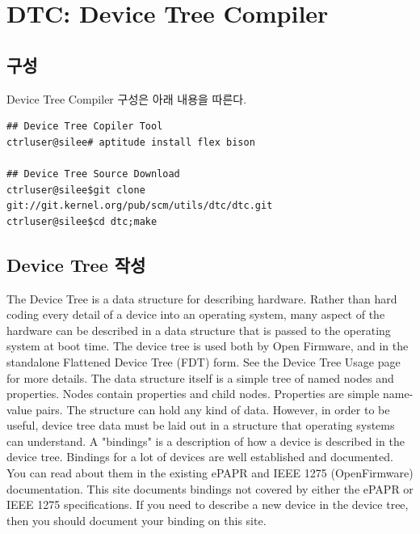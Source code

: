 \documentclass[11pt
  , a4paper
  , article
  , oneside
]{memoir}
\begin{document}
\hfil\break

\chapter{DTC: Device Tree Compiler}


\section{구성}
Device Tree Compiler 구성은 아래 내용을 따른다.
\begin{lstlisting}[style=termstyle]
## Device Tree Copiler Tool
ctrluser@silee# aptitude install flex bison

## Device Tree Source Download
ctrluser@silee$git clone git://git.kernel.org/pub/scm/utils/dtc/dtc.git
ctrluser@silee$cd dtc;make
\end{lstlisting}
\section{Device Tree 작성}
The Device Tree is a data structure for describing hardware. Rather than hard coding every detail of a device into an operating system, many aspect of the hardware can be described in a data structure that is passed to the operating system at boot time. The device tree is used both by Open Firmware, and in the standalone Flattened Device Tree (FDT) form.
See the Device Tree Usage page for more details.
The data structure itself is a simple tree of named nodes and properties. Nodes contain properties and child nodes. Properties are simple name-value pairs. The structure can hold any kind of data.
However, in order to be useful, device tree data must be laid out in a structure that operating systems can understand. A "bindings" is a description of how a device is described in the device tree. Bindings for a lot of devices are well established and documented. You can read about them in the existing ePAPR and IEEE 1275 (OpenFirmware) documentation.
This site documents bindings not covered by either the ePAPR or IEEE 1275 specifications. If you need to describe a new device in the device tree, then you should document your binding on this site.
\end{document}
